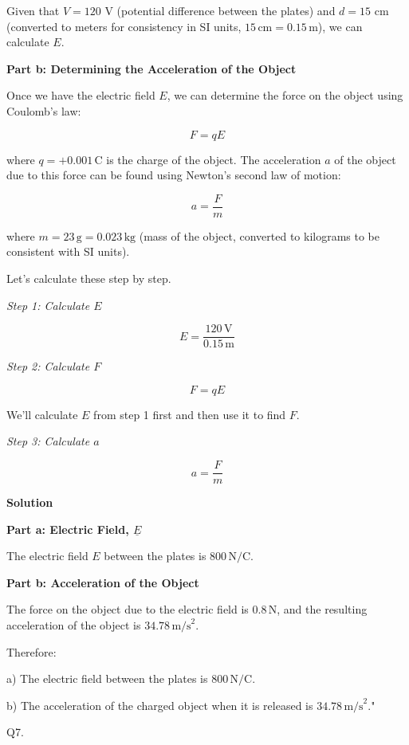 Given that \( V = 120 \) V (potential difference between the plates) and \( d = 15 \) cm (converted to meters for consistency in SI units, \( 15 \, \text{cm} = 0.15 \, \text{m} \)), we can calculate \( E \).

\textbf{Part b: Determining the Acceleration of the Object}

Once we have the electric field \( E \), we can determine the force on the object using Coulomb's law:

\[
F = qE
\]

where \( q = +0.001 \, \text{C} \) is the charge of the object. The acceleration \( a \) of the object due to this force can be found using Newton's second law of motion:

\[
a = \frac{F}{m}
\]

where \( m = 23 \, \text{g} = 0.023 \, \text{kg} \) (mass of the object, converted to kilograms to be consistent with SI units).

Let's calculate these step by step.

\textit{Step 1: Calculate \( E \)}

\[
E = \frac{120 \, \text{V}}{0.15 \, \text{m}}
\]

\textit{Step 2: Calculate \( F \)}

\[
F = qE
\]

We'll calculate \( E \) from step 1 first and then use it to find \( F \).

\textit{Step 3: Calculate \( a \)}

\[
a = \frac{F}{m}
\]

\textbf{Solution}

\textbf{Part a: Electric Field, \( \underline{E} \)}

The electric field \( E \) between the plates is \( 800 \, \text{N/C} \).

\textbf{Part b: Acceleration of the Object}

The force on the object due to the electric field is \( 0.8 \, \text{N} \), and the resulting acceleration of the object is \( 34.78 \, \text{m/s}^2 \).

Therefore:

a) The electric field between the plates is \( 800 \, \text{N/C} \).

b) The acceleration of the charged object when it is released is \( 34.78 \, \text{m/s}^2 \)."



                              Q7. 

